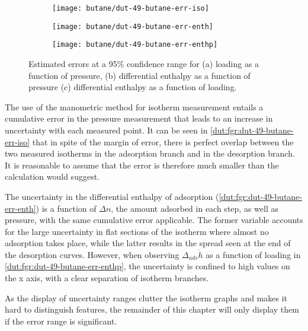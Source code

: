 \begin{figure}[htb]
    \centering
    \begin{subfigure}{0.33\linewidth}
        \texttt{[image: butane/dut-49-butane-err-iso]}%
        \caption{}\label{dut:fgr:dut-49-butane-err-iso}
    \end{subfigure}%
    \begin{subfigure}{0.33\linewidth}
        \texttt{[image: butane/dut-49-butane-err-enth]}%
        \caption{}\label{dut:fgr:dut-49-butane-err-enth}
    \end{subfigure}%
    \begin{subfigure}{0.33\linewidth}
        \texttt{[image: butane/dut-49-butane-err-enthp]}%
        \caption{}\label{dut:fgr:dut-49-butane-err-enthp}
    \end{subfigure}%
    \caption{Estimated errors at a 95\% confidence range for 
    (a) loading as a function of pressure, 
    (b) differential enthalpy as a function of pressure 
    (c) differential enthalpy as a function of loading.}%
    \label{dut:fgr:dut-49-butane-err}
\end{figure}

The use of the manometric method for isotherm measurement entails a 
cumulative error in the pressure measurement that leads to an increase
in uncertainty with each measured point. It can be seen in 
\autoref{dut:fgr:dut-49-butane-err-iso} that in spite of the margin of 
error, there is perfect overlap between the two measured isotherms
in the adsorption branch and in the desorption branch. It is reasonable
to assume that the error is therefore much smaller than the calculation 
would suggest.

The uncertainty in the differential enthalpy of adsorption 
(\autoref{dut:fgr:dut-49-butane-err-enth}) is a 
function of \(\Delta n\), the amount adsorbed in each step, as well
as pressure, with the same cumulative error applicable. The former 
variable accounts for the large uncertainty in flat sections of 
the isotherm where almost no adsorption takes place, while the latter
results in the spread seen at the end of the desorption curves. 
However, when observing \(\Delta_{ads} \dot{h}\) as a function of 
loading in \autoref{dut:fgr:dut-49-butane-err-enthp}, the uncertainty 
is confined to high values on the x axis, with a clear separation
of isotherm branches.

As the display of uncertainty ranges clutter the isotherm graphs and 
makes it hard to distinguish features, the remainder of this chapter 
will only display them if the error range is significant.